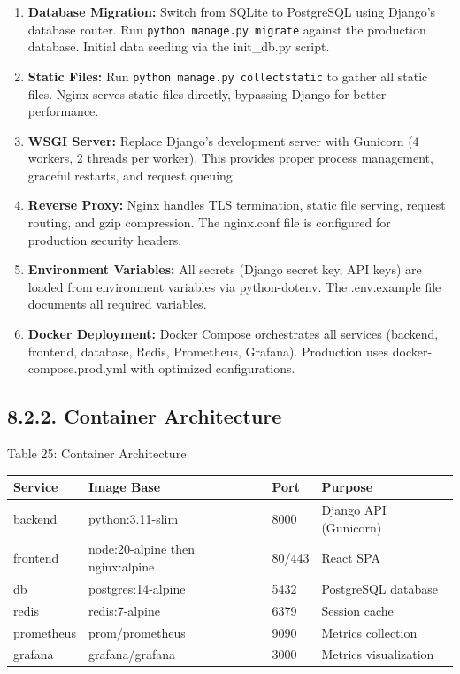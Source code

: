 \documentclass[12pt, a4paper]{report}
\begin{document}
\begin{enumerate}[leftmargin=*]
  \item \textbf{Database Migration:} Switch from SQLite to PostgreSQL using Django's database router. Run \texttt{python manage.py migrate} against the production database. Initial data seeding via the init\_db.py script.
  \item \textbf{Static Files:} Run \texttt{python manage.py collectstatic} to gather all static files. Nginx serves static files directly, bypassing Django for better performance.
  \item \textbf{WSGI Server:} Replace Django's development server with Gunicorn (4 workers, 2 threads per worker). This provides proper process management, graceful restarts, and request queuing.
  \item \textbf{Reverse Proxy:} Nginx handles TLS termination, static file serving, request routing, and gzip compression. The nginx.conf file is configured for production security headers.
  \item \textbf{Environment Variables:} All secrets (Django secret key, API keys) are loaded from environment variables via python-dotenv. The .env.example file documents all required variables.
  \item \textbf{Docker Deployment:} Docker Compose orchestrates all services (backend, frontend, database, Redis, Prometheus, Grafana). Production uses docker-compose.prod.yml with optimized configurations.
\end{enumerate}
\subsection{8.2.2. Container Architecture}
Table 25: Container Architecture

\begin{table}[htbp]
\centering
\small
\begin{tabularx}{\textwidth}{|X|X|X|X|}
\hline
Service & Image Base & Port & Purpose \\
\hline
backend & python:3.11-slim & 8000 & Django API (Gunicorn) \\
frontend & node:20-alpine then nginx:alpine & 80/443 & React SPA \\
db & postgres:14-alpine & 5432 & PostgreSQL database \\
redis & redis:7-alpine & 6379 & Session cache \\
prometheus & prom/prometheus & 9090 & Metrics collection \\
grafana & grafana/grafana & 3000 & Metrics visualization \\
\hline
\end{tabularx}
\end{table}
\end{document}
